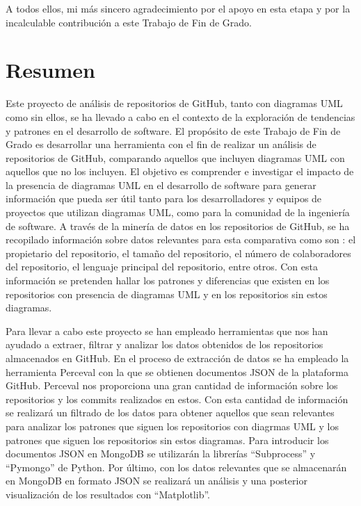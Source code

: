 \documentclass[a4paper, 12pt]{book}
\begin{document}
A todos ellos, mi más sincero agradecimiento por el apoyo en esta etapa y por la incalculable contribución a este Trabajo de Fin de Grado.
 


\chapter*{Resumen}

Este proyecto de análisis de repositorios de GitHub, tanto con diagramas UML como sin ellos, se ha llevado a cabo en el contexto de la exploración de tendencias y patrones en el desarrollo de software.
El propósito de este Trabajo de Fin de Grado es desarrollar una herramienta con el fin de realizar un análisis de repositorios de GitHub, comparando aquellos que incluyen diagramas UML con aquellos que no los incluyen. 
El objetivo es comprender e investigar el impacto de la presencia de diagramas UML en el desarrollo de software para generar información que pueda ser útil tanto para los desarrolladores y equipos de proyectos que utilizan diagramas UML, como para la comunidad de la ingeniería de software. 
A través de la minería de datos en los repositorios de GitHub, se ha recopilado información sobre datos relevantes para esta comparativa como son : el propietario del repositorio, el tamaño del repositorio, el número de colaboradores del repositorio, el lenguaje principal del repositorio, entre otros.
Con esta información se pretenden hallar los patrones y diferencias que existen en los repositorios con presencia de diagramas UML y en los repositorios sin estos diagramas. 


Para llevar a cabo este proyecto se han empleado herramientas que nos han ayudado a extraer, filtrar y analizar los datos obtenidos de los repositorios almacenados en GitHub.
En el proceso de extracción de datos se ha empleado la herramienta Perceval con la que se obtienen documentos JSON de la plataforma GitHub.
Perceval nos proporciona una gran cantidad de información sobre los repositorios y los commits realizados en estos.
Con esta cantidad de información se realizará un filtrado de los datos para obtener aquellos que sean relevantes para analizar los patrones que siguen los repositorios con diagrmas UML y los patrones que siguen los repositorios sin estos diagramas.
Para introducir los documentos JSON en MongoDB se utilizarán la librerías ``Subprocess'' y ``Pymongo'' de Python.
Por último, con los datos relevantes que se almacenarán en MongoDB en formato JSON se realizará un análisis y una posterior visualización de los resultados con ``Matplotlib''.  
\end{document}
